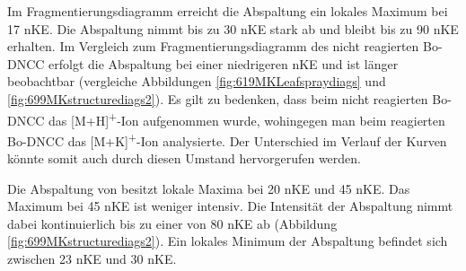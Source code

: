 Im Fragmentierungsdiagramm erreicht die  Abspaltung ein lokales Maximum bei 17 \gls{nKE}. Die Abspaltung nimmt bis zu 30 \gls{nKE} stark ab und bleibt bis zu 90 \gls{nKE} erhalten. Im Vergleich zum Fragmentierungsdiagramm des nicht reagierten Bo-DNCC erfolgt die  Abspaltung bei einer niedrigeren \gls{nKE} und ist länger beobachtbar (vergleiche Abbildungen \ref{fig:619MKLeafspraydiags} und \ref{fig:699MKstructurediags2}). Es gilt zu bedenken, dass beim nicht reagierten Bo-DNCC das [M+H]\textsuperscript{+}-Ion aufgenommen wurde, wohingegen man beim reagierten Bo-DNCC das [M+K]\textsuperscript{+}-Ion analysierte. Der Unterschied im Verlauf der Kurven könnte somit auch durch diesen Umstand hervorgerufen werden.

Die Abspaltung von  besitzt lokale Maxima bei 20 \gls{nKE} und 45 \gls{nKE}. Das Maximum bei 45 \gls{nKE} ist weniger intensiv. Die Intensität der Abspaltung nimmt dabei kontinuierlich bis zu einer von 80 \gls{nKE} ab (Abbildung \ref{fig:699MKstructurediags2}). Ein lokales Minimum der Abspaltung befindet sich zwischen 23 \gls{nKE} und 30 \gls{nKE}. \\

